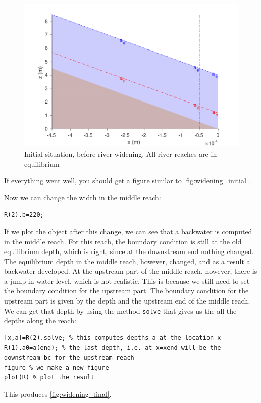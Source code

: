 \documentclass[a4paper]{article}
\begin{document}
\begin{figure}[h]
  \centering
  \includegraphics{widening_initial.pdf}
  \caption{Initial situation, before river widening. All river reaches are in equilibrium}
  \label{fig:widening_initial}
\end{figure}
If everything went well, you should get a figure similar to \autoref{fig:widening_initial}.

Now we can change the width in the middle reach:
\begin{lstlisting}
R(2).b=220;
\end{lstlisting}
If we plot the object after this change, we can see that a backwater is computed in the middle reach. For this reach, the boundary condition is still at the old equilibrium depth, which is right, since at the downstream end nothing changed. The equilibrium depth in the middle reach, however, changed, and as a result a backwater developed. At the upstream part of the middle reach, however, there is a jump in water level, which is not realistic. This is because we still need to set the boundary condition for the upstream part. The boundary condition for the upstream part is given by the depth and the upstream end of the middle reach. We can get that depth by using the method \lstinline{solve} that gives us the all the depths along the reach:
\begin{lstlisting}
[x,a]=R(2).solve; % this computes depths a at the location x
R(1).a0=a(end); % the last depth, i.e. at x=xend will be the downstream bc for the upstream reach
figure % we make a new figure
plot(R) % plot the result
\end{lstlisting}
This produces \autoref{fig:widening_final}.
\end{document}

